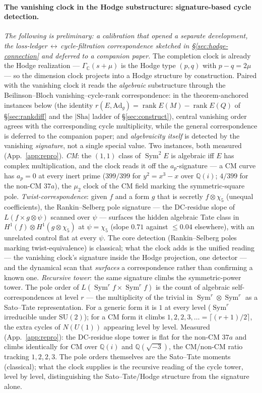 \documentclass[11pt]{article}
\theoremstyle{definition}
\newcommand{\Sym}{\operatorname{Sym}}
\newcommand{\Sha}{\mathrm{Sha}}
\begin{document}
\paragraph{The vanishing clock in the Hodge substructure: signature-based cycle detection.}
\emph{The following is preliminary: a calibration that opened a separate development, the
loss-ledger$\,\leftrightarrow\,$cycle-filtration correspondence sketched in \S\ref{sec:hodge-connection}
and deferred to a companion paper.} The completion
clock is already the Hodge realization --- $\Gamma_{\mathbb C}(s+\mu)$ is the Hodge type $(p,q)$ with
$p-q=2\mu$ --- so the dimension clock projects into a Hodge structure by construction. Paired with the
vanishing clock it reads the \emph{algebraic} substructure through the Beilinson--Bloch
vanishing--cycle-rank correspondence: in the theorem-anchored instances below (the identity
$r(E,\mathrm{Ad}_g)=\operatorname{rank}E(M)-\operatorname{rank}E(Q)$ of \S\ref{sec:rankdiff} and the
$|\Sha|$ ladder of \S\ref{sec:construct}), central vanishing order agrees with the corresponding cycle
multiplicity, while the general correspondence is deferred to the companion paper; and
\emph{algebraicity itself} is detected by the vanishing \emph{signature}, not a single special value. Two
instances, both measured (App.~\ref{app:repro}). \emph{CM}: the $(1,1)$ class of $\Sym^2 E$ is algebraic
iff $E$ has complex multiplication, and the clock reads it off the $a_p$-signature --- a CM curve has
$a_p=0$ at every inert prime ($399/399$ for $y^2=x^3-x$ over $\mathbb Q(i)$; $4/399$ for the non-CM $37a$),
the $\mu_2$ clock of the CM field marking the symmetric-square pole. \emph{Twist-correspondence}: given $f$
and a form $g$ that is secretly $f\otimes\chi_5$ (unequal coefficients), the Rankin--Selberg pole signature
--- the DC-residue slope of $L(f\times g\otimes\psi)$ scanned over $\psi$ --- surfaces the hidden algebraic
Tate class in $H^1(f)\otimes H^1(g\otimes\chi_5)$ at $\psi=\chi_5$ (slope $0.71$ against $\le0.04$
elsewhere), with an unrelated control flat at every $\psi$. The core detection (Rankin--Selberg poles
marking twist-equivalence) is classical; what the clock adds is the unified reading --- the vanishing
clock's signature inside the Hodge projection, one detector --- and the dynamical scan that \emph{surfaces}
a correspondence rather than confirming a known one. \emph{Recursive tower}: the same signature climbs the
symmetric-power tower. The pole order of $L(\Sym^r f\times\Sym^r f)$ is the count of algebraic
self-correspondences at level $r$ --- the multiplicity of the trivial in $\Sym^r\otimes\Sym^r$ as a
Sato--Tate representation. For a generic form it is $1$ at every level ($\Sym^r$ irreducible under
$\mathrm{SU}(2)$); for a CM form it climbs $1,2,2,3,\dots=\lceil(r{+}1)/2\rceil$, the extra cycles of
$N(U(1))$ appearing level by level. Measured (App.~\ref{app:repro}): the DC-residue slope tower is flat for
the non-CM $37a$ and climbs identically for CM over $\mathbb Q(i)$ and $\mathbb Q(\sqrt{-3})$, the
CM/non-CM ratio tracking $1,2,2,3$. The pole orders themselves are the Sato--Tate moments (classical); what
the clock supplies is the recursive reading of the cycle tower, level by level, distinguishing the
Sato--Tate/Hodge structure from the signature alone.
\end{document}
